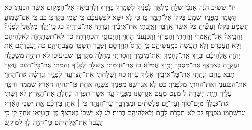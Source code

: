 \documentclass[twoside, openany, parskip=half, 11pt]{book}
\begin{document}
יז* ששיכ הִנֵּ֨ה אָנֹכִ֜י שֹׁלֵ֤חַ מַלְאָךְ֙ לְפָנֶ֔יךָ לִשְׁמָרְךָ֖ בַּדָּ֑רֶךְ וְלַהֲבִ֣יאֲךָ֔ אֶל־הַמָּק֖וֹם אֲשֶׁ֥ר הֲכִנֹֽתִי׃ כא הִשָּׁ֧מֶר מִפָּנָ֛יו וּשְׁמַ֥ע בְּקֹל֖וֹ אַל־תַּמֵּ֣ר בּ֑וֹ כִּ֣י לֹ֤א יִשָּׂא֙ לְפִשְׁעֲכֶ֔ם כִּ֥י שְׁמִ֖י בְּקִרְבּֽוֹ׃ כב כִּ֣י אִם־שָׁמ֤וֹעַ תִּשְׁמַע֙ בְּקֹל֔וֹ וְעָשִׂ֕יתָ כֹּ֖ל אֲשֶׁ֣ר אֲדַבֵּ֑ר וְאָֽיַבְתִּי֙ אֶת־אֹ֣יְבֶ֔יךָ וְצַרְתִּ֖י אֶת־צֹרְרֶֽיךָ׃ כג כִּֽי־יֵלֵ֣ךְ מַלְאָכִי֮ לְפָנֶ֒יךָ֒ וֶהֱבִֽיאֲךָ֗ אֶל־הָֽאֱמֹרִי֙ וְהַ֣חִתִּ֔י וְהַפְּרִזִּי֙ וְהַֽכְּנַעֲנִ֔י הַחִוִּ֖י וְהַיְבוּסִ֑י וְהִכְחַדְתִּֽיו׃ כד לֹֽא־תִשְׁתַּחֲוֶ֤ה לֵאלֹֽהֵיהֶם֙ וְלֹ֣א תָֽעׇבְדֵ֔ם וְלֹ֥א תַעֲשֶׂ֖ה כְּמַֽעֲשֵׂיהֶ֑ם כִּ֤י הָרֵס֙ תְּהָ֣רְסֵ֔ם וְשַׁבֵּ֥ר תְּשַׁבֵּ֖ר מַצֵּבֹתֵיהֶֽם׃ כה וַעֲבַדְתֶּ֗ם אֵ֚ת יְהֹוָ֣ה אֱלֹֽהֵיכֶ֔ם וּבֵרַ֥ךְ אֶֽת־לַחְמְךָ֖ וְאֶת־מֵימֶ֑יךָ וַהֲסִרֹתִ֥י מַחֲלָ֖ה מִקִּרְבֶּֽךָ׃
שביעיכו לֹ֥א תִהְיֶ֛ה מְשַׁכֵּלָ֥ה וַעֲקָרָ֖ה בְּאַרְצֶ֑ךָ אֶת־מִסְפַּ֥ר יָמֶ֖יךָ אֲמַלֵּֽא׃ כז אֶת־אֵֽימָתִי֙ אֲשַׁלַּ֣ח לְפָנֶ֔יךָ וְהַמֹּתִי֙ אֶת־כׇּל־הָעָ֔ם אֲשֶׁ֥ר תָּבֹ֖א בָּהֶ֑ם וְנָתַתִּ֧י אֶת־כׇּל־אֹיְבֶ֛יךָ אֵלֶ֖יךָ עֹֽרֶף׃ כח וְשָׁלַחְתִּ֥י אֶת־הַצִּרְעָ֖ה לְפָנֶ֑יךָ וְגֵרְשָׁ֗ה אֶת־הַחִוִּ֧י אֶת־הַֽכְּנַעֲנִ֛י וְאֶת־הַחִתִּ֖י מִלְּפָנֶֽיךָ׃ כט לֹ֧א אֲגָרְשֶׁ֛נּוּ מִפָּנֶ֖יךָ בְּשָׁנָ֣ה אֶחָ֑ת פֶּן־תִּהְיֶ֤ה הָאָ֙רֶץ֙ שְׁמָמָ֔ה וְרַבָּ֥ה עָלֶ֖יךָ חַיַּ֥ת הַשָּׂדֶֽה׃ ל מְעַ֥ט מְעַ֛ט אֲגָרְשֶׁ֖נּוּ מִפָּנֶ֑יךָ עַ֚ד אֲשֶׁ֣ר תִּפְרֶ֔ה וְנָחַלְתָּ֖ אֶת־הָאָֽרֶץ׃ לא וְשַׁתִּ֣י אֶת־גְּבֻלְךָ֗ מִיַּם־סוּף֙ וְעַד־יָ֣ם פְּלִשְׁתִּ֔ים וּמִמִּדְבָּ֖ר עַד־הַנָּהָ֑ר כִּ֣י ׀ אֶתֵּ֣ן בְּיֶדְכֶ֗ם אֵ֚ת יֹשְׁבֵ֣י הָאָ֔רֶץ וְגֵרַשְׁתָּ֖מוֹ מִפָּנֶֽיךָ׃ לב לֹֽא־תִכְרֹ֥ת לָהֶ֛ם וְלֵאלֹֽהֵיהֶ֖ם בְּרִֽית׃ לג לֹ֤א יֵשְׁבוּ֙ בְּאַרְצְךָ֔ פֶּן־יַחֲטִ֥יאוּ אֹתְךָ֖ לִ֑י כִּ֤י תַעֲבֹד֙ אֶת־אֱלֹ֣הֵיהֶ֔ם כִּֽי־יִהְיֶ֥ה לְךָ֖ לְמוֹקֵֽשׁ׃
\end{document}
